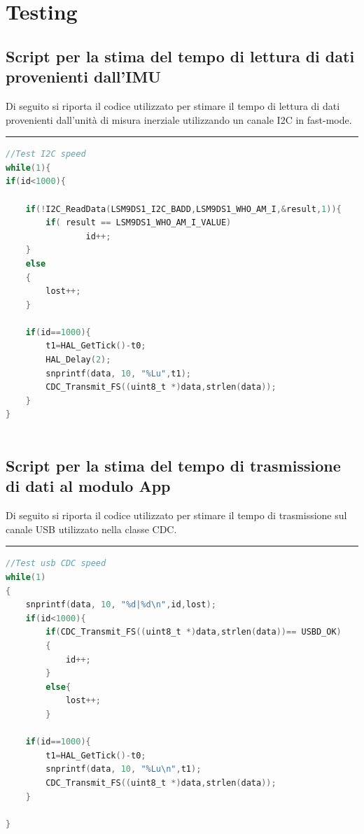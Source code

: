 \section{Testing}
\subsection{Script per la stima del tempo di lettura di dati provenienti dall'IMU }
\label{app:stimai2c}
Di seguito si riporta il codice utilizzato per stimare il tempo di lettura di dati provenienti dall'unità di misura inerziale utilizzando un canale I2C in fast-mode.\\
\noindent\rule{14.1cm}{0.4pt}
\begin{lstlisting}[language=C]
//Test I2C speed
while(1){
if(id<1000){

	if(!I2C_ReadData(LSM9DS1_I2C_BADD,LSM9DS1_WHO_AM_I,&result,1)){
		if( result == LSM9DS1_WHO_AM_I_VALUE)
				id++;
	}
	else
	{
		lost++;
	}
	
 	if(id==1000){
		t1=HAL_GetTick()-t0;
		HAL_Delay(2);
		snprintf(data, 10, "%Lu",t1);
		CDC_Transmit_FS((uint8_t *)data,strlen(data));
	}
}



\end{lstlisting}


\subsection{Script per la stima del tempo di trasmissione di dati al modulo App}
\label{app:stimausb}
Di seguito si riporta il codice utilizzato per stimare il tempo di trasmissione sul canale USB utilizzato nella classe CDC.\\
\noindent\rule{14.1cm}{0.4pt}

\begin{lstlisting}[language=C]
 //Test usb CDC speed
while(1)
{
	snprintf(data, 10, "%d|%d\n",id,lost);
	if(id<1000){
		if(CDC_Transmit_FS((uint8_t *)data,strlen(data))== USBD_OK)
		{
			id++;
		}
		else{
			lost++;
		}

	if(id==1000){
		t1=HAL_GetTick()-t0;
		snprintf(data, 10, "%Lu\n",t1);
		CDC_Transmit_FS((uint8_t *)data,strlen(data));
	}
	
}



\end{lstlisting}


